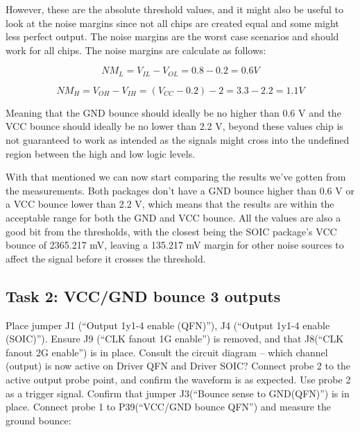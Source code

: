 \documentclass[../main.tex]{subfiles}
\begin{document}
However, these are the absolute threshold values, and it might also be useful to look at the noise margins since not all chips are created equal and some might less perfect output. The noise margins are the worst case scenarios and should work for all chips. The noise margins are calculate as follows:

\begin{equation*}
    NM_{L} = V_{IL} - V_{OL} = 0.8 - 0.2 = 0.6 V
\end{equation*}

\begin{equation*}
    NM_{H} = V_{OH} - V_{IH} = (V_{CC} - 0.2) - 2 = 3.3 - 2.2 = 1.1 V
\end{equation*}

Meaning that the GND bounce should ideally be no higher than 0.6 V and the VCC bounce should ideally be no lower than 2.2 V, beyond these values chip is not guaranteed to work as intended as the signals might cross into the undefined region between the high and low logic levels.

\vspace{10pt}

With that mentioned we can now start comparing the results we've gotten from the measurements. Both packages don't have a GND bounce higher than 0.6 V or a VCC bounce lower than 2.2 V, which means that the results are within the acceptable range for both the GND and VCC bounce. All the values are also a good bit from the thresholds, with the closest being the SOIC package's VCC bounce of 2365.217 mV, leaving a 135.217 mV margin for other noise sources to affect the signal before it crosses the threshold.

\subsection{Task 2: VCC/GND bounce 3 outputs}

Place jumper J1 (“Output 1y1-4 enable (QFN)”), J4 (“Output 1y1-4 enable (SOIC)”). Ensure J9 (“CLK fanout 1G enable”) is removed, and that J8(“CLK fanout 2G enable”) is in place.
\vspace{10pt}
Consult the circuit diagram – which channel (output) is now active on Driver QFN and Driver SOIC? Connect probe 2 to the active output probe point, and confirm the waveform is as expected. Use probe 2 as a trigger signal.
\vspace{10pt}
Confirm that jumper J3(“Bounce sense to GND(QFN)”) is in place. Connect probe 1 to P39(“VCC/GND bounce QFN”) and measure the ground bounce:
\end{document}
